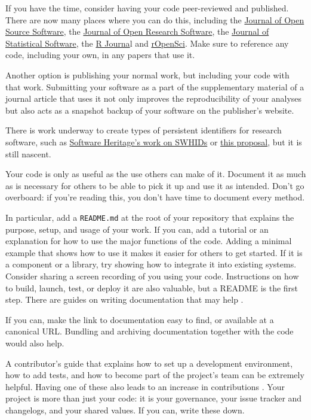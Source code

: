 \documentclass[10pt,letterpaper]{article}
\begin{document}
If you have the time,
consider having your code peer-reviewed and published.
There are now many places where you can do this,
including the \href{https://joss.theoj.org/}{Journal of Open Source Software},
the \href{https://openresearchsoftware.metajnl.com/}{Journal of Open Research Software},
the \href{http://www.jstatsoft.org}{Journal of Statistical Software},
the \href{https://journal.r-project.org/}{R Journa}l
and \href{https://ropensci.org/}{rOpenSci}.
Make sure to reference any code,
including your own,
in any papers that use it.

Another option is publishing your normal work,
but including your code with that work.
Submitting your software as a part of the supplementary material of a journal article that uses it
not only improves the reproducibility of your analyses
but also acts as a snapshot backup of your software on the publisher's website.

There is work underway to create types of persistent identifiers for research software,
such as \href{https://interoperable-europe.ec.europa.eu/collection/open-source-observatory-osor/news/swhid-intrinsic-identifier-software-artefacts}{Software Heritage's work on SWHIDs}
or \href{https://arxiv.org/abs/2501.10415}{this proposal},
but it is still nascent.

Your code is only as useful as the use others can make of it.
Document it as much as is necessary for others to be able to pick it up and use it as intended.
Don't go overboard:
if you're reading this,
you don't have time to document every method.

In particular,
add a \texttt{README.md} at the root of your repository
that explains the purpose, setup, and usage of your work.
If you can,
add a tutorial or an explanation for how to use the major functions of the code.
Adding a minimal example that shows how to use it makes it easier for others to get started.
If it is a component or a library,
try showing how to integrate it into existing systems.
Consider sharing a screen recording of you using your code.
Instructions on how to build,
launch, test, or deploy it are also valuable,
but a README is the first step.
There are guides on writing documentation that may help
\cite{Huybrechts2024,Littauer2025,Katz2025,Turing2025}.

If you can, make the link to documentation easy to find, or available at a canonical URL.
Bundling and archiving documentation together with the code would also help.

A contributor's guide that explains how to set up a development environment,
how to add tests,
and how to become part of the project's team can be extremely helpful.
Having one of these also leads to an increase in contributions \cite{Sholler2019}.
Your project is more than just your code:
it is your governance,
your issue tracker and changelogs,
and your shared values.
If you can, write these down.
\end{document}
